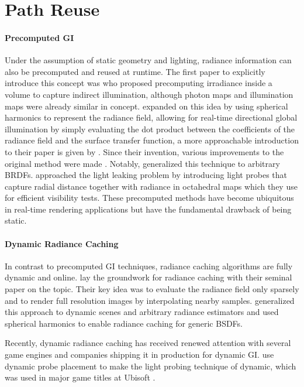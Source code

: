 \section{Path Reuse}

\paragraph{Precomputed GI}
Under the assumption of static geometry and lighting, radiance information can also be precomputed and reused at runtime.
The first paper to explicitly introduce this concept was \textcite{greger1998} who proposed precomputing irradiance inside a volume to capture indirect illumination, although photon maps \parencite{jensen1996} and illumination maps \parencite{arvo1986,heckbert1990} were already similar in concept.
\textcite{sloan2002} expanded on this idea by using spherical harmonics to represent the radiance field, allowing for real-time directional global illumination by simply evaluating the dot product between the coefficients of the radiance field and the surface transfer function, a more approachable introduction to their paper is given by \textcite{green2003}.
Since their invention, various improvements to the original method were made \parencite{krivanek2007}.
Notably, \textcite{kautz2002} generalized this technique to arbitrary BRDFs.
\textcite{mcguire2017} approached the light leaking problem by introducing light probes that capture radial distance together with radiance in octahedral maps \parencite{engelhardt2008,cigolle2014} which they use for efficient visibility tests.
These precomputed methods have become ubiquitous in real-time rendering applications \parencite{odonnell2018,iwanicki2017} but have the fundamental drawback of being static.

\paragraph{Dynamic Radiance Caching}
In contrast to precomputed GI techniques, radiance caching algorithms are fully dynamic and online.
\textcite{ward1988} lay the groundwork for radiance caching with their seminal paper on the topic.
Their key idea was to evaluate the radiance field only sparsely and to render full resolution images by interpolating nearby samples.
\textcite{tole2002} generalized this approach to dynamic scenes and arbitrary radiance estimators and \textcite{krivanek2005} used spherical harmonics to enable radiance caching for generic BSDFs.

Recently, dynamic radiance caching has received renewed attention with several game engines and companies shipping it in production for dynamic GI.
\textcite{majercik2019} use dynamic probe placement to make the light probing technique of \textcite{mcguire2017} dynamic, which was used in major game titles at Ubisoft \parencite{kuenlin2024}.

